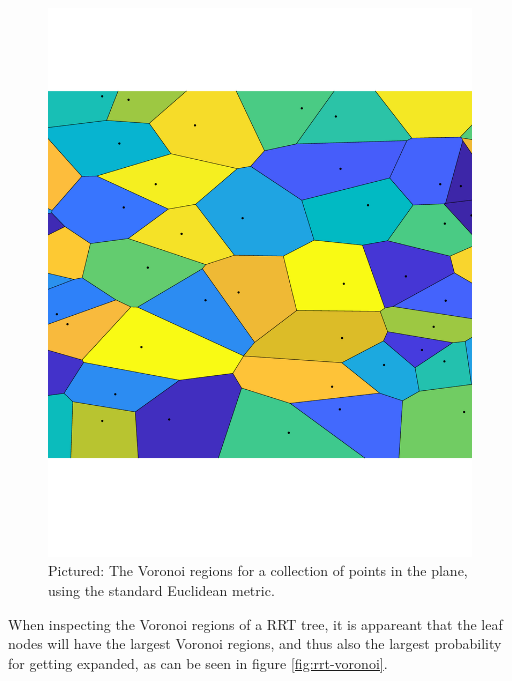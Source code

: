 \begin{figure}
  \label{fig:voronoi-diagram}
  \includegraphics[scale=.3]{figures/rrt/voronoi-diagram}
  \caption{Pictured: The Voronoi regions for a collection of points in the plane,
    using the standard Euclidean metric.}
\end{figure}

When inspecting the Voronoi regions of a \ac{RRT} tree, it is appareant that the
leaf nodes will have the largest Voronoi regions, and thus also the largest
probability for getting expanded, as can be seen in figure \ref{fig:rrt-voronoi}.

